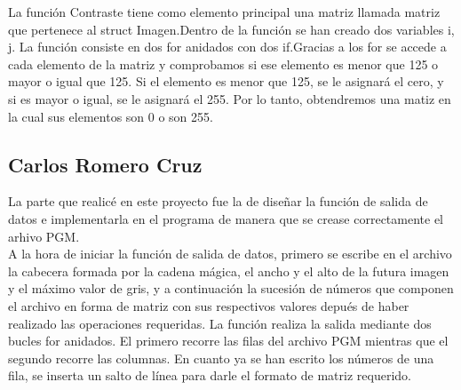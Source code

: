 \documentclass[a4paper, 11pt, spanish]{article}
\begin{document}
La función Contraste tiene como elemento principal una matriz llamada matriz que pertenece al struct Imagen.Dentro de la función se han creado dos variables i, j. La función consiste en dos for anidados con dos if.Gracias a los for se accede a cada elemento de la matriz y comprobamos si ese elemento es menor que 125 o mayor o igual que 125. Si el elemento es menor que 125, se le asignará el cero, y si es mayor o igual, se le asignará el 255. Por lo tanto, obtendremos una matiz en la cual sus elementos son 0 o son 255.


\subsection{Carlos Romero Cruz}

La parte que realicé en este proyecto fue la de diseñar la función de salida de datos e implementarla en el programa de manera que se crease correctamente el arhivo PGM.
\\

A la hora de iniciar la función de salida de datos, primero se escribe en el archivo la cabecera formada por la cadena mágica, el ancho y el alto de la futura imagen y el máximo valor de gris, y a continuación la sucesión de números que componen el archivo en forma de matriz con sus respectivos valores depués de haber realizado las operaciones requeridas. La función realiza la salida mediante dos bucles for anidados. El primero recorre las filas del archivo PGM mientras que el segundo recorre las columnas. En cuanto ya se han escrito los números de una fila, se inserta un salto de línea para darle el formato de matriz requerido.
\end{document}

